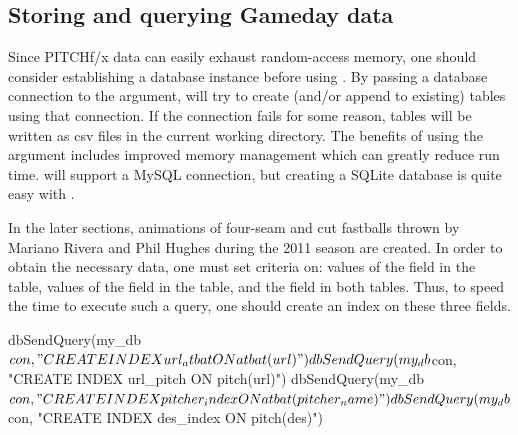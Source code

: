 \begin{article}
\section{Storing and querying Gameday data}
Since PITCHf/x data can easily exhaust random-access memory, one should
consider establishing a database instance before using .
By passing a database connection to the  argument,
 will try to create (and/or append to existing) tables
using that connection. If the connection fails for some reason, tables
will be written as csv files in the current working directory. The
benefits of using the  argument includes improved memory
management which can greatly reduce run time.  will
support a MySQL connection, but creating a SQLite database is quite
easy with  \citep{dplyr}. 
%
\begin{Schunk}
\end{Schunk}
%

In the later sections, animations of four-seam and cut fastballs thrown
by Mariano Rivera and Phil Hughes during the 2011 season are created.
In order to obtain the necessary data, one must set criteria on: values
of the  field in the  table, values
of the  field in the  table, and the 
field in both tables. Thus, to speed the time to execute such a query,
one should create an index on these three fields.
%
\begin{Schunk}
\begin{Sinput}
dbSendQuery(my_db$con, "CREATE INDEX url_atbat ON atbat(url)") 
dbSendQuery(my_db$con, "CREATE INDEX url_pitch ON pitch(url)") 
dbSendQuery(my_db$con, "CREATE INDEX pitcher_index ON atbat(pitcher_name)") 
dbSendQuery(my_db$con, "CREATE INDEX des_index ON pitch(des)")
\end{Sinput}
\end{Schunk}
%


\end{article}
